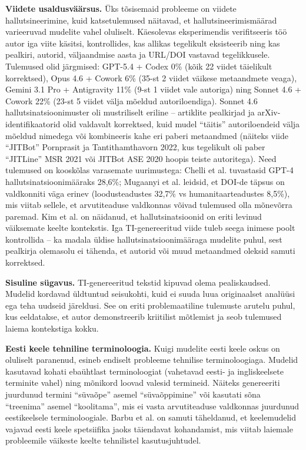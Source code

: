 \textbf{Viidete usaldusväärsus.} Üks tõsisemaid probleeme on viidete hallutsineerimine, kuid katsetulemused näitavad, et hallutsineerimismäärad varieeruvad mudelite vahel oluliselt. Käesolevas eksperimendis verifitseeris töö autor iga viite käsitsi, kontrollides, kas allikas tegelikult eksisteerib ning kas pealkiri, autorid, väljaandmise aasta ja URL/DOI vastavad tegelikkusele. Tulemused olid järgmised: GPT-5.4 + Codex 0\% (kõik 22 viidet täielikult korrektsed), Opus 4.6 + Cowork 6\% (35-st 2 viidet väikese metaandmete veaga), Gemini 3.1 Pro + Antigravity 11\% (9-st 1 viidet vale autoriga) ning Sonnet 4.6 + Cowork 22\% (23-st 5 viidet välja mõeldud autoriloendiga). Sonnet 4.6 hallutsinatsioonimuster oli mustriliselt eriline -- artiklite pealkirjad ja arXiv-identifikaatorid olid valdavalt korrektsed, kuid mudel ``täitis'' autoriloendeid välja mõeldud nimedega või kombineeris kahe eri paberi metaandmed (näiteks viide ``JITBot'' Pornprasit ja Tantithamthavorn 2022, kus tegelikult oli paber ``JITLine'' MSR 2021 või JITBot ASE 2020 hoopis teiste autoritega). Need tulemused on kooskõlas varasemate uurimustega: Chelli et al. \cite{chelli2024hallucination} tuvastasid GPT-4 hallutsinatsioonimääraks 28,6\%; Mugaanyi et al. \cite{mugaanyi2024citation} leidsid, et DOI-de täpsus on valdkonniti väga erinev (loodusteadustes 32,7\% vs humanitaarteadustes 8,5\%), mis viitab sellele, et arvutiteaduse valdkonnas võivad tulemused olla mõnevõrra paremad. Kim et al. \cite{kim2025geographic} on näidanud, et hallutsinatsioonid on eriti levinud väiksemate keelte kontekstis. Iga TI-genereeritud viide tuleb seega inimese poolt kontrollida -- ka madala üldise hallutsinatsioonimääraga mudelite puhul, sest pealkirja olemasolu ei tähenda, et autorid või muud metaandmed oleksid samuti korrektsed.

\textbf{Sisuline sügavus.} TI-genereeritud tekstid kipuvad olema pealiskaudsed. Mudelid kordavad üldtuntud seisukohti, kuid ei suuda luua originaalset analüüsi ega teha uudseid järeldusi. See on eriti problemaatiline tulemuste arutelu puhul, kus eeldatakse, et autor demonstreerib kriitilist mõtlemist ja seob tulemused laiema kontekstiga kokku.

\textbf{Eesti keele tehniline terminoloogia.} Kuigi mudelite eesti keele oskus on oluliselt paranenud, esineb endiselt probleeme tehnilise terminoloogiaga. Mudelid kasutavad kohati ebaühtlast terminoloogiat (vahetavad eesti- ja ingliskeelsete terminite vahel) ning mõnikord loovad valesid termineid. Näiteks genereeriti juurdunud termini ``süvaõpe'' asemel ``süvaõppimine'' või kasutati sõna ``treenima'' asemel ``koolitama'', mis ei vasta arvutiteaduse valdkonnas juurdunud eesti\-keelsele terminoloogiale. Barbu et al. \cite{barbu2025estonian} on samuti täheldanud, et keelemudelid vajavad eesti keele spetsiifika jaoks täiendavat kohandamist, mis viitab laiemale probleemile väikeste keelte tehnilistel kasutusjuhtudel.

